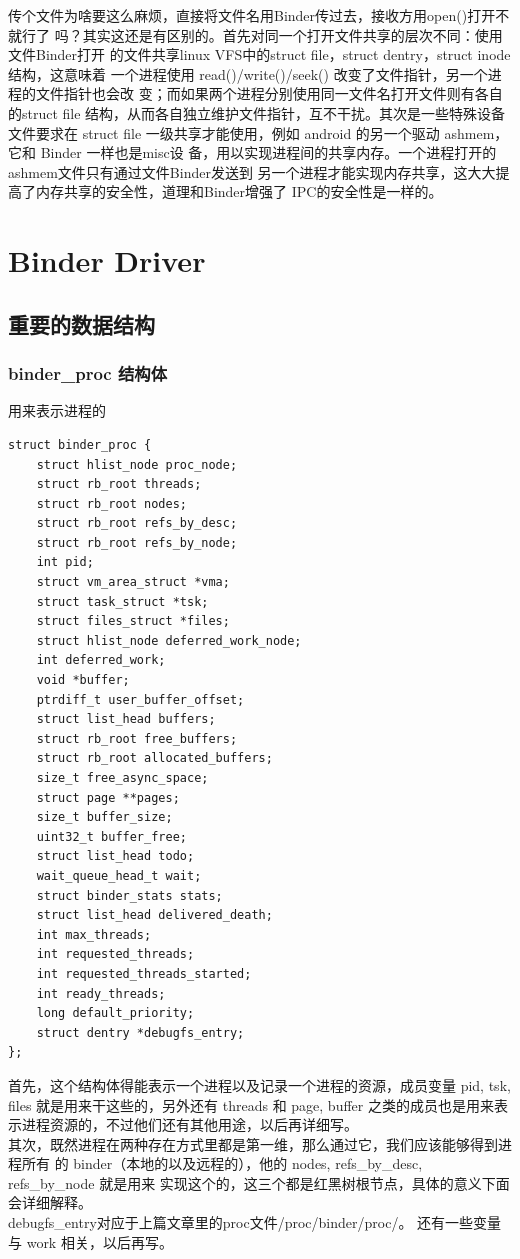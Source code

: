 \documentclass[a4paper,11pt]{article}
\begin{document}
传个文件为啥要这么麻烦，直接将文件名用Binder传过去，接收方用open()打开不就行了
吗？其实这还是有区别的。首先对同一个打开文件共享的层次不同：使用文件Binder打开
的文件共享linux VFS中的struct file，struct dentry，struct inode结构，这意味着
一个进程使用 read()/write()/seek() 改变了文件指针，另一个进程的文件指针也会改
变；而如果两个进程分别使用同一文件名打开文件则有各自的struct file
结构，从而各自独立维护文件指针，互不干扰。其次是一些特殊设备文件要求在
struct file 一级共享才能使用，例如 android 的另一个驱动 ashmem，它和 Binder 一样也是misc设
备，用以实现进程间的共享内存。一个进程打开的ashmem文件只有通过文件Binder发送到
另一个进程才能实现内存共享，这大大提高了内存共享的安全性，道理和Binder增强了
IPC的安全性是一样的。

\section{Binder Driver}

\subsection{重要的数据结构}
\subsubsection{binder_proc 结构体}
用来表示进程的
\begin{lstlisting}[language=KC, multicols=2]
struct binder_proc {
    struct hlist_node proc_node;
    struct rb_root threads;
    struct rb_root nodes;
    struct rb_root refs_by_desc;
    struct rb_root refs_by_node;
    int pid;
    struct vm_area_struct *vma;
    struct task_struct *tsk;
    struct files_struct *files;
    struct hlist_node deferred_work_node;
    int deferred_work;
    void *buffer;
    ptrdiff_t user_buffer_offset;
    struct list_head buffers;
    struct rb_root free_buffers;
    struct rb_root allocated_buffers;
    size_t free_async_space;
    struct page **pages;
    size_t buffer_size;
    uint32_t buffer_free;
    struct list_head todo;
    wait_queue_head_t wait;
    struct binder_stats stats;
    struct list_head delivered_death;
    int max_threads;
    int requested_threads;
    int requested_threads_started;
    int ready_threads;
    long default_priority;
    struct dentry *debugfs_entry;
};
\end{lstlisting}
首先，这个结构体得能表示一个进程以及记录一个进程的资源，成员变量 pid, tsk,
files 就是用来干这些的，另外还有 threads 和 page, buffer 之类的成员也是用来表
示进程资源的，不过他们还有其他用途，以后再详细写。\\
其次，既然进程在两种存在方式里都是第一维，那么通过它，我们应该能够得到进程所有
的 binder（本地的以及远程的），他的 nodes, refs_by_desc, refs_by_node 就是用来
实现这个的，这三个都是红黑树根节点，具体的意义下面会详细解释。\\
debugfs_entry对应于上篇文章里的proc文件/proc/binder/proc/。
还有一些变量与 work 相关，以后再写。
\end{document}
